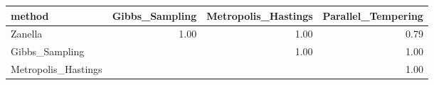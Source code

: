 \begin{table}[ht]
\centering
\begin{tabular}{lrrr}
  \hline
method & Gibbs\_Sampling & Metropolis\_Hastings & Parallel\_Tempering \\ 
  \hline
Zanella & 1.00 & 1.00 & 0.79 \\ 
  Gibbs\_Sampling &  & 1.00 & 1.00 \\ 
  Metropolis\_Hastings &  &  & 1.00 \\ 
   \hline
\end{tabular}
\end{table}
